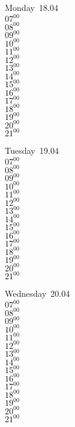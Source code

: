 \documentclass[11pt,a4paper]{book}\usepackage[]{graphicx}\usepackage[]{color}
\begin{document}
\begin{headerbox}
\end{headerbox}
\begin{weekdaybox}
  Monday~18.04\\
  { 
  \vfill
  $07^{00}$\\
$08^{00}$\\
$09^{00}$\\
$10^{00}$\\
$11^{00}$\\
$12^{00}$\\
$13^{00}$\\
$14^{00}$\\
$15^{00}$\\
$16^{00}$\\
$17^{00}$\\
$18^{00}$\\
$19^{00}$\\
$20^{00}$\\
$21^{00}$\\
  }
\end{weekdaybox}
\begin{weekdaybox}
  Tuesday~19.04\\
  { 
  \vfill
  $07^{00}$\\
$08^{00}$\\
$09^{00}$\\
$10^{00}$\\
$11^{00}$\\
$12^{00}$\\
$13^{00}$\\
$14^{00}$\\
$15^{00}$\\
$16^{00}$\\
$17^{00}$\\
$18^{00}$\\
$19^{00}$\\
$20^{00}$\\
$21^{00}$\\
  }
\end{weekdaybox}
\begin{weekdaybox}
  Wednesday~20.04\\
  { 
  \vfill
  $07^{00}$\\
$08^{00}$\\
$09^{00}$\\
$10^{00}$\\
$11^{00}$\\
$12^{00}$\\
$13^{00}$\\
$14^{00}$\\
$15^{00}$\\
$16^{00}$\\
$17^{00}$\\
$18^{00}$\\
$19^{00}$\\
$20^{00}$\\
$21^{00}$\\
  }
\end{weekdaybox}
\end{document}
